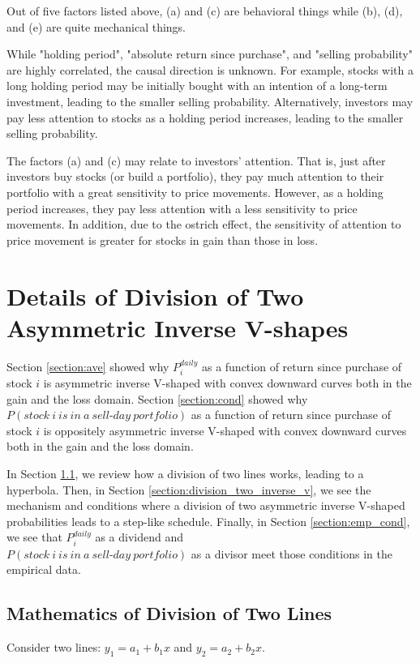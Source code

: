 \documentclass[11pt, a4paper]{article}
\begin{document}
Out of five factors listed above, (a) and (c) are behavioral things while (b), (d), and (e) are quite mechanical things.

While "holding period", "absolute return since purchase", and "selling probability" are highly correlated, the causal direction is unknown. For example, stocks with a long holding period may be initially bought with an intention of a long-term investment, leading to the smaller selling probability. Alternatively, investors may pay less attention to stocks as a holding period increases, leading to the smaller selling probability.


The factors (a) and (c) may relate to investors' attention. That is, just after investors buy stocks (or build a portfolio), they pay much attention to their portfolio with a great sensitivity to price movements. However, as a holding period increases, they pay less attention with a less sensitivity to price movements. In addition, due to the ostrich effect, the sensitivity of attention to price movement is greater for stocks in gain than those in loss. 

\section{Details of Division of Two Asymmetric Inverse V-shapes}
\label{section:condition}
Section \ref{section:ave} showed why $P^{daily}_{i}$ as a function of return since purchase of stock $i$ is asymmetric inverse V-shaped with convex downward curves both in the gain and the loss domain. Section \ref{section:cond} showed why $P(stock~i~is~in~a~sell\mbox{-}day~portfolio)$ as a function of return since purchase of stock $i$ is oppositely asymmetric inverse V-shaped with convex downward curves both in the gain and the loss domain.

In Section \ref{section:division_two_lines}, we review how a division of two lines works, leading to a hyperbola. Then, in Section \ref{section:division_two_inverse_v}, we see the mechanism and conditions where a division of two asymmetric inverse V-shaped probabilities leads to a step-like schedule. Finally, in Section \ref{section:emp_cond}, we see that $P^{daily}_{i}$ as a dividend and\\ $P(stock~i~is~in~a~sell\mbox{-}day~portfolio)$ as a divisor meet those conditions in the empirical data.

\subsection{Mathematics of Division of Two Lines}
\label{section:division_two_lines}
Consider two lines: $y_1=a_1+b_1x$ and $y_2=a_2+b_2x$.\\
\end{document}
